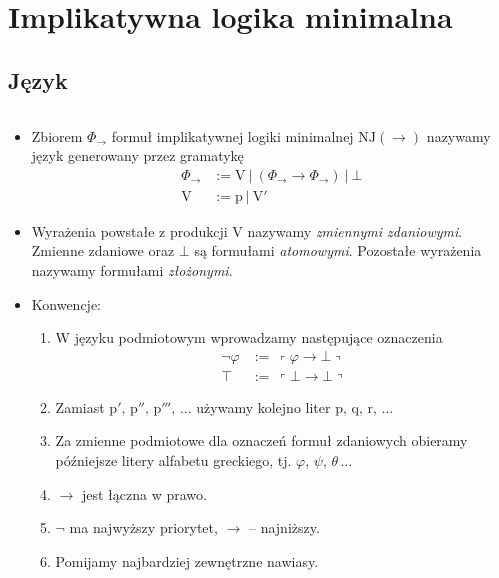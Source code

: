 \section{Implikatywna logika minimalna}
\subsection{Język}

\begin{definicja}$ $\newline
  \begin{itemize}
    \item  Zbiorem \(\Phi_{\to}\) formuł implikatywnej logiki minimalnej \(\mathrm{NJ}(\to)\) nazywamy język generowany przez gramatykę
    \begin{align*}
    \Phi_{\to} &:= \mathrm{V}\ |\ \left ( \Phi_{\to} \rightarrow \Phi_{\to} \right )\ |\ \bot\\
    \mathrm{V} &:= \mathrm{p}\ |\ \mathrm{V'}
    \end{align*}

    \item Wyrażenia powstałe z produkcji V nazywamy \emph{zmiennymi zdaniowymi}. Zmienne zdaniowe oraz \(\bot\) są formułami \emph{atomowymi}. Pozostałe wyrażenia nazywamy formułami \emph{złożonymi}.


\item  Konwencje: \begin{enumerate}
    \item W języku podmiotowym wprowadzamy następujące oznaczenia
    \begin{align*}
      \lnot \varphi &:=\ \left\ulcorner\varphi\rightarrow\bot\right\urcorner\\
      \top &:=\ \left\ulcorner\bot\rightarrow\bot\right\urcorner
    \end{align*}

    \item Zamiast \(\mathrm{p'},\, \mathrm{p''},\, \mathrm{p'''},\, \dots\) używamy kolejno liter \(\mathrm{p},\, \mathrm{q},\, \mathrm{r},\, \dots\)
    \item Za zmienne podmiotowe dla oznaczeń formuł zdaniowych obieramy późniejsze litery alfabetu greckiego, tj. \(\varphi,\, \psi,\, \theta\,\dots\)
    \item \(\rightarrow\) jest łączna w prawo.
    \item \(\lnot\) ma najwyższy priorytet, \(\rightarrow\) – najniższy.
    \item Pomijamy najbardziej zewnętrzne nawiasy.
  \end{enumerate}


\end{itemize}
\end{definicja}
